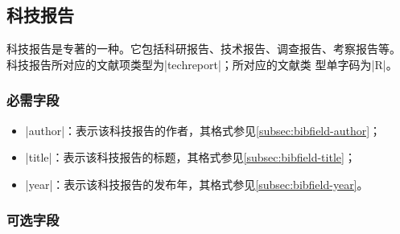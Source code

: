 
\subsection{科技报告}\label{subsec:bibtype-techreport}

科技报告是专著的一种。它包括科研报告、技术报告、调查报告、考察报告等\cite{gbt3469-1983}。
科技报告所对应的{\BibTeX}文献项类型为|techreport|；所对应的文献类
型单字码为|R|\cite{gbt3469-1983}。

\subsubsection{必需字段}

\begin{itemize}
\item |author|：表示该科技报告的作者，其格式参见\ref{subsec:bibfield-author}；
\item |title|：表示该科技报告的标题，其格式参见\ref{subsec:bibfield-title}；
\item |year|：表示该科技报告的发布年，其格式参见\ref{subsec:bibfield-year}。
\end{itemize}

\subsubsection{可选字段}

